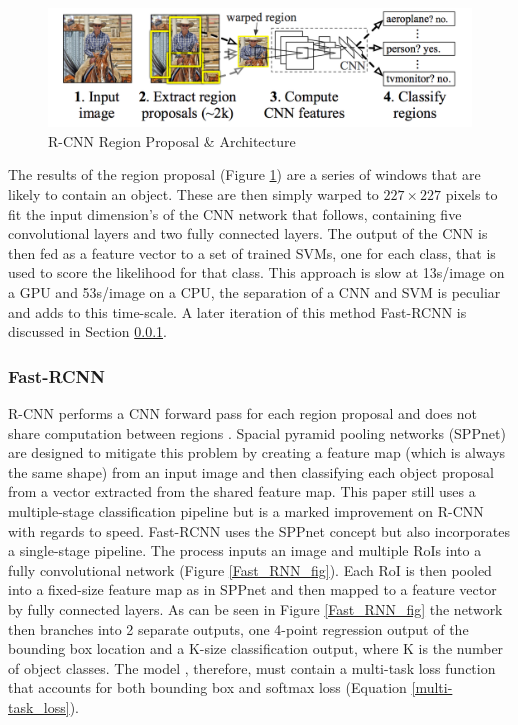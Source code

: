 \documentclass[11pt,twoside]{report}
\begin{document}
\noindent \begin{figure}[h!]
	\includegraphics[width = 1.0\hsize]{./figures/region_prop.png}
	\caption{R-CNN Region Proposal \& Architecture \cite{DBLP:journals/corr/GirshickDDM13}}
	\label{Selective_search}
\end{figure}

The results of the region proposal (Figure \ref{Selective_search}) are a series of windows that are likely to contain an object. These are then simply warped to $227 \times 227$ pixels to fit the input dimension's of the CNN network that follows, containing five convolutional layers and two fully connected layers. The output of the CNN is then fed as a feature vector to a set of trained SVMs, one for each class, that is used to score the likelihood for that class. This approach is slow at 13s/image on a GPU and 53s/image on a CPU, the separation of a CNN and SVM is peculiar and adds to this time-scale. A later iteration of this method Fast-RCNN is discussed in Section \ref{Fast_RCNN}.

\subsubsection{Fast-RCNN} \label{Fast_RCNN}

R-CNN performs a CNN forward pass for each region proposal and does not share computation between regions \cite{DBLP:journals/corr/Girshick15}. Spacial pyramid pooling networks (SPPnet) \cite{DBLP:journals/corr/HeZR014} are designed to mitigate this problem by creating a feature map (which is always the same shape) from an input image and then classifying each object proposal from a vector extracted from the shared feature map. This paper still uses a multiple-stage classification pipeline but is a marked improvement on R-CNN with regards to speed. 
\newline \newline
Fast-RCNN uses the SPPnet concept but also incorporates a single-stage pipeline. The process inputs an image and multiple RoIs into a fully convolutional network (Figure \ref{Fast_RNN_fig}). Each RoI is then pooled into a fixed-size feature map as in SPPnet and then mapped to a feature vector by fully connected layers. As can be seen in Figure \ref{Fast_RNN_fig} the network then branches into 2 separate outputs, one 4-point regression output of the bounding box location and a K-size classification output, where K is the number of object classes. The model , therefore, must contain a multi-task loss function that accounts for both bounding box and softmax loss (Equation \ref{multi-task_loss}).
\end{document}
